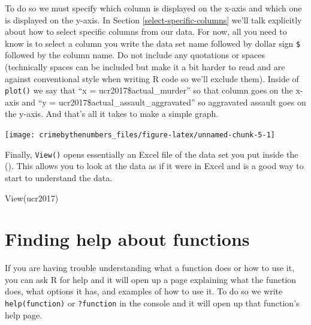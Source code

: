 \documentclass[
]{krantz}
\makeatletter
\newenvironment{Shaded}{\begin{snugshade}}{\end{snugshade}}
\newcommand{\AttributeTok}[1]{\textcolor[rgb]{0.61,0.61,0.61}{#1}}
\newcommand{\FunctionTok}[1]{\textcolor[rgb]{0,0,0}{#1}}
\newcommand{\NormalTok}[1]{#1}
\newcommand{\SpecialCharTok}[1]{\textcolor[rgb]{0,0,0}{#1}}
\newenvironment{kframe}{%
\medskip{}
\setlength{\fboxsep}{.8em}
 \def\at@end@of@kframe{}%
 \ifinner\ifhmode%
  \def\at@end@of@kframe{\end{minipage}}%
  \begin{minipage}{\columnwidth}%
 \fi\fi%
 \def\FrameCommand##1{\hskip\@totalleftmargin \hskip-\fboxsep
 \colorbox{shadecolor}{##1}\hskip-\fboxsep
     \hskip-\linewidth \hskip-\@totalleftmargin \hskip\columnwidth}%
 \MakeFramed {\advance\hsize-\width
   \@totalleftmargin\z@ \linewidth\hsize
   \@setminipage}}%
 {\par\unskip\endMakeFramed%
 \at@end@of@kframe}
\renewenvironment{Shaded}{\begin{kframe}}{\end{kframe}}
\makeatother
\begin{document}
To do so we must specify which column is displayed on the x-axis and which one is displayed on the y-axis. In Section \ref{select-specific-columns} we'll talk explicitly about how to select specific columns from our data. For now, all you need to know is to select a column you write the data set name followed by dollar sign \texttt{\$} followed by the column name. Do not include any quotations or spaces (technically spaces can be included but make it a bit harder to read and are against conventional style when writing R code so we'll exclude them). Inside of \texttt{plot()} we say that ``x = ucr2017\$actual\_murder'' so that column goes on the x-axis and ``y = ucr2017\$actual\_assault\_aggravated'' so aggravated assault goes on the y-axis. And that's all it takes to make a simple graph.

\begin{Shaded}
\end{Shaded}

\begin{center}\texttt{[image: crimebythenumbers\_files/figure-latex/unnamed-chunk-5-1]} \end{center}

Finally, \texttt{View()} opens essentially an Excel file of the data set you put inside the (). This allows you to look at the data as if it were in Excel and is a good way to start to understand the data.

\begin{Shaded}
\begin{Highlighting}[]
\FunctionTok{View}\NormalTok{(ucr2017)}
\end{Highlighting}
\end{Shaded}

\hypertarget{finding-help-about-functions}{%
\section{Finding help about functions}\label{finding-help-about-functions}}

If you are having trouble understanding what a function does or how to use it, you can ask R for help and it will open up a page explaining what the function does, what options it has, and examples of how to use it. To do so we write \texttt{help(function)} or \texttt{?function} in the console and it will open up that function's help page.
\end{document}
